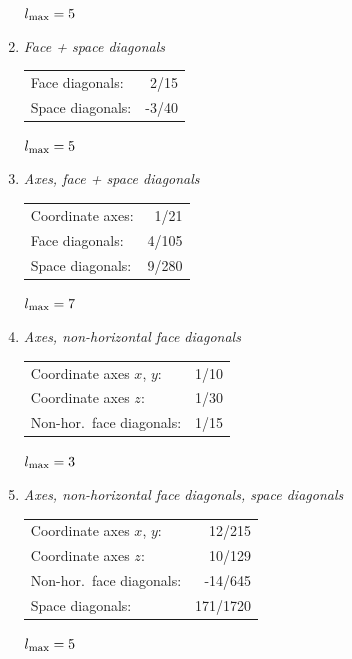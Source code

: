 \documentclass[\mydriver,12pt,twoside,notitlepage,a4paper]{article}
\begin{document}
\begin{enumerate}
  $l_{\rm max} = 5$

\item \emph{Face + space diagonals}

  \begin{tabular}{@{}lr}
    Face diagonals:  &  2/15 \\
    Space diagonals: & -3/40 \\
  \end{tabular}

  $l_{\rm max} = 5$

\item \emph{Axes, face + space diagonals}

  \begin{tabular}{@{}lr}
    Coordinate axes: & 1/21 \\
    Face diagonals:  & 4/105 \\
    Space diagonals: & 9/280 \\
  \end{tabular}

  $l_{\rm max} = 7$

\item \emph{Axes, non-horizontal face diagonals}

  \begin{tabular}{@{}lr}
    Coordinate axes $x$, $y$: & 1/10 \\
    Coordinate axes $z$:      & 1/30 \\
    Non-hor.~face diagonals:  & 1/15 \\
  \end{tabular}

  $l_{\rm max} = 3$

\item \emph{Axes, non-horizontal face diagonals, space diagonals}

  \begin{tabular}{@{}lr}
    Coordinate axes $x$, $y$: & 12/215 \\
    Coordinate axes $z$:      & 10/129 \\
    Non-hor.~face diagonals:  & -14/645 \\
    Space diagonals:          & 171/1720 \\
  \end{tabular}

  $l_{\rm max} = 5$

\end{enumerate}


\end{document}
